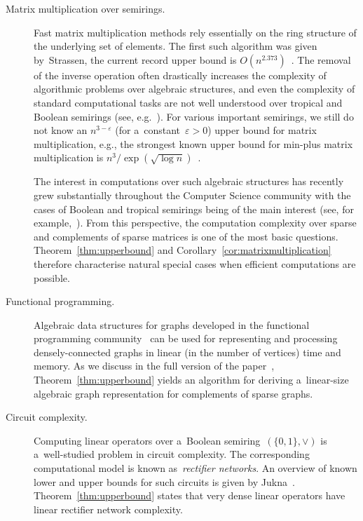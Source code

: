 \documentclass[a4paper,UKenglish,cleveref, autoref]{lipics-v2019}
\begin{document}
\begin{description}
\item[Matrix multiplication over semirings.] Fast matrix
multiplication methods rely essentially on the ring structure of the underlying
set of elements. The first such algorithm was given by~Strassen,
the current record upper bound is $O(n^{2.373})$~\cite{DBLP:conf/stoc/Williams12, DBLP:conf/issac/Gall14a}.
The removal of the inverse operation often drastically increases the complexity
of algorithmic problems over algebraic structures, and even the complexity of
standard computational tasks are not well understood over tropical and
Boolean semirings (see, e.g.~\cite{Williams14,GrigorievP15}).
For various important semirings,
we still do not know an $n^{3-\varepsilon}$ (for a~constant~$\varepsilon>0$) upper
bound for matrix multiplication, e.g., the strongest known upper bound for
min-plus matrix multiplication is $n^3/\exp(\sqrt{\log n})$~\cite{Williams14}.

The interest in computations over such algebraic structures has
recently grew substantially throughout the
Computer Science community with the cases of Boolean and
tropical semirings being of the main interest (see, for
example,~\cite{Jukna16,Williams14,butkovic10systems}).
From this perspective, the computation complexity over sparse and complements of
sparse matrices is one of the most basic questions.
Theorem~\ref{thm:upperbound} and Corollary~\ref{cor:matrixmultiplication}
therefore characterise natural special
cases when efficient computations are possible.

\item[Functional programming.]
Algebraic data structures for graphs developed in the functional programming
community~\cite{mokhov2017algebraic} can be used for representing and processing
densely-connected graphs in linear (in the number of vertices) time and memory.
As we discuss in 
the full version of the paper~\cite{DBLP:journals/eccc/KulikovMMP19},
Theorem~\ref{thm:upperbound}
yields an algorithm for deriving a~linear-size algebraic graph representation
for complements of sparse graphs.

\item[Circuit complexity.] Computing linear operators over
a~Boolean semiring~$(\{0,1\}, \lor)$ is a~well-studied problem
in circuit complexity. The corresponding computational model is known
as~\emph{rectifier networks}. An overview of known lower and upper bounds for
such circuits is given by Jukna~\cite[Section~13.6]{DBLP:books/daglib/0028687}.
Theorem~\ref{thm:upperbound} states that very dense linear operators have
linear rectifier network complexity.
\end{description}
\end{document}
